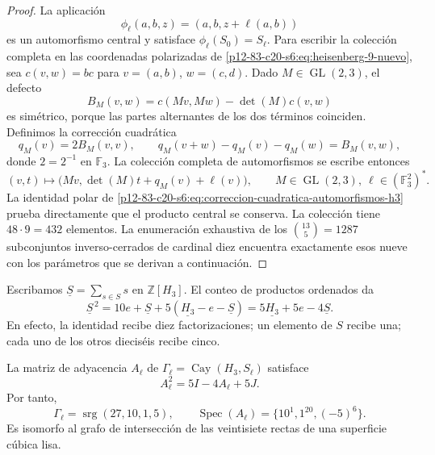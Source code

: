 \begin{proof}
La aplicación
\[
 \phi_\ell(a,b,z)=(a,b,z+\ell(a,b))
\]
es un automorfismo central y satisface
\(\phi_\ell(S_0)=S_\ell\). Para escribir la colección completa en las
coordenadas polarizadas de \cref{p12-83-c20-s6:eq:heisenberg-9-nuevo}, sea
\(c(v,w)=b c\) para \(v=(a,b)\), \(w=(c,d)\). Dado
\(M\in\operatorname{GL}(2,3)\), el defecto
\[
 B_M(v,w)=c(Mv,Mw)-\det(M)c(v,w)
\]
es simétrico, porque las partes alternantes de los dos términos coinciden.
Definimos la corrección cuadrática
\begin{equation}
 q_M(v)=2B_M(v,v),
 \qquad
 q_M(v+w)-q_M(v)-q_M(w)=B_M(v,w),
 \label{p12-83-c20-s6:eq:correccion-cuadratica-automorfismos-h3}
\end{equation}
donde \(2=2^{-1}\) en \(\mathbb F_3\). La colección completa de
automorfismos se escribe entonces
\begin{equation}
 (v,t)\longmapsto
 \bigl(Mv,\det(M)t+q_M(v)+\ell(v)\bigr),
 \qquad M\in\operatorname{GL}(2,3),\
 \ell\in(\mathbb F_3^2)^*.
 \label{p12-83-c20-s6:eq:automorfismos-h3-completos}
\end{equation}
La identidad polar de \cref{p12-83-c20-s6:eq:correccion-cuadratica-automorfismos-h3}
prueba directamente que el producto central se conserva. La colección tiene
\(48\cdot9=432\) elementos. La enumeración exhaustiva de los
\(\binom{13}{5}=1287\) subconjuntos inverso-cerrados de cardinal diez
encuentra exactamente esos nueve con los parámetros que se derivan a
continuación.
\end{proof}

Escribamos \(\underline S=\sum_{s\in S}s\) en
\(\mathbb Z[H_3]\). El conteo de productos ordenados da
\begin{equation}
 \underline S^{\,2}
 =10e+\underline S+5(\underline{H_3}-e-\underline S)
 =5\underline{H_3}+5e-4\underline S.
 \label{p12-83-c20-s6:eq:identidad-grupo-schlafli-nueva}
\end{equation}
En efecto, la identidad recibe diez factorizaciones; un elemento de
\(S\) recibe una; cada uno de los otros dieciséis recibe cinco.

\begin{theorem}
\label{p12-83-c20-s6:thm:grafo-27-rectas-nuevo}
La matriz de adyacencia \(A_\ell\) de
\(\Gamma_\ell=\operatorname{Cay}(H_3,S_\ell)\) satisface
\begin{equation}
 A_\ell^2=5I-4A_\ell+5J.
 \label{p12-83-c20-s6:eq:identidad-schlafli-nueva}
\end{equation}
Por tanto,
\[
 \Gamma_\ell=\operatorname{srg}(27,10,1,5),
 \qquad
 \operatorname{Spec}(A_\ell)=\{10^1,1^{20},(-5)^6\}.
\]
Es isomorfo al grafo de intersección de las veintisiete rectas de una
superficie cúbica lisa.
\end{theorem}

